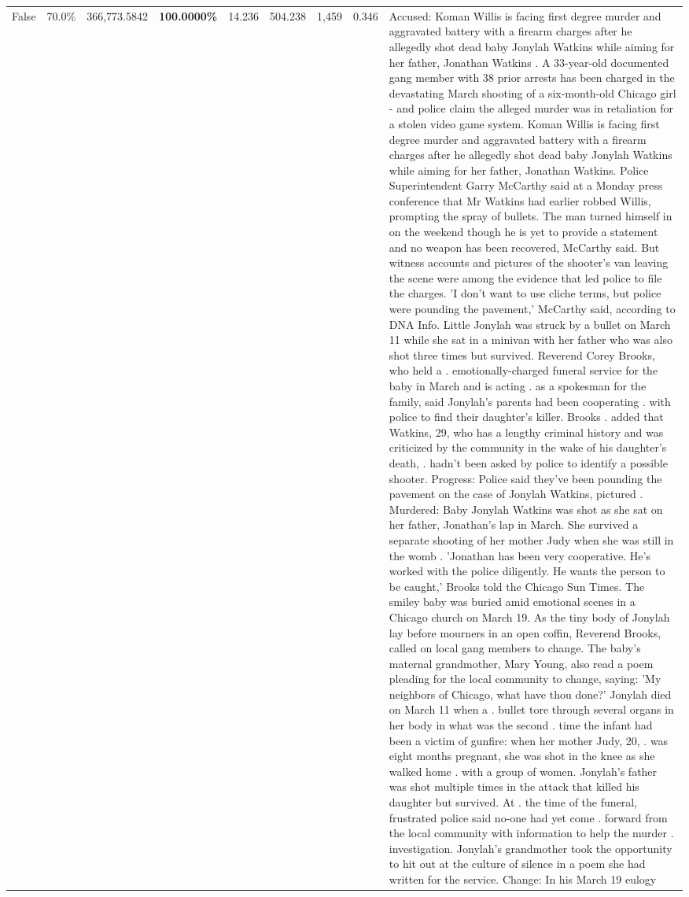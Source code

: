 \begin{table}[H]
\begin{tabular}{lllrlllll}
False & 70.0\% & 366,773.5842 & \bfseries \color{red} 100.0000\% & 14.236 & 504.238 & 1,459 & 0.346 & Accused: Koman Willis is facing first degree murder and aggravated battery with a firearm charges after he allegedly shot dead baby Jonylah Watkins while aiming for her father, Jonathan Watkins . A 33-year-old documented gang member with 38 prior arrests has been charged in the devastating March shooting of a six-month-old Chicago girl - and police claim the alleged murder was in retaliation for a stolen video game system. Koman Willis is facing first degree murder and aggravated battery with a firearm charges after he allegedly shot dead baby Jonylah Watkins while aiming for her father, Jonathan Watkins. Police Superintendent Garry McCarthy said at a Monday press conference that Mr Watkins had earlier robbed Willis, prompting the spray of bullets. The man turned himself in on the weekend though he is yet to provide a statement and no weapon has been recovered, McCarthy said. But witness accounts and pictures of the shooter's van leaving the scene were among the evidence that led police to file the charges. 'I don't want to use cliche terms, but police were pounding the pavement,' McCarthy said, according to DNA Info. Little Jonylah was struck by a bullet on March 11 while she sat in a minivan with her father who was also shot three times but survived. Reverend Corey Brooks, who held a . emotionally-charged funeral service for the baby in March and is acting . as a spokesman for the family, said Jonylah's parents had been cooperating . with police to find their daughter's killer. Brooks . added that Watkins, 29, who has a lengthy criminal history and was criticized by the community in the wake of his daughter's death, . hadn't been asked by police to identify a possible shooter. Progress: Police said they've been pounding the pavement on the case of Jonylah Watkins, pictured . Murdered: Baby Jonylah Watkins was shot as she sat on her father, Jonathan's lap in March. She survived a separate shooting of her mother Judy when she was still in the womb . 'Jonathan has been very cooperative. He's worked with the police diligently. He wants the person to be caught,' Brooks told the Chicago Sun Times. The smiley baby was buried amid emotional scenes in a Chicago church on March 19. As the tiny body of Jonylah lay before mourners in an open coffin, Reverend Brooks, called on local gang members to change. The baby's maternal grandmother, Mary Young, also read a poem pleading for the local community to change, saying: 'My neighbors of Chicago, what have thou done?' Jonylah died on March 11 when a . bullet tore through several organs in her body in what was the second . time the infant had been a victim of gunfire: when her mother Judy, 20, . was eight months pregnant, she was shot in the knee as she walked home . with a group of women. Jonylah's father was shot multiple times in the attack that killed his daughter but survived. At . the time of the funeral, frustrated police said no-one had yet come . forward from the local community with information to help the murder . investigation. Jonylah's grandmother took the opportunity to hit out at the culture of silence in a poem she had written for the service. Change: In his March 19 eulogy 
\end{tabular}
\end{table}
